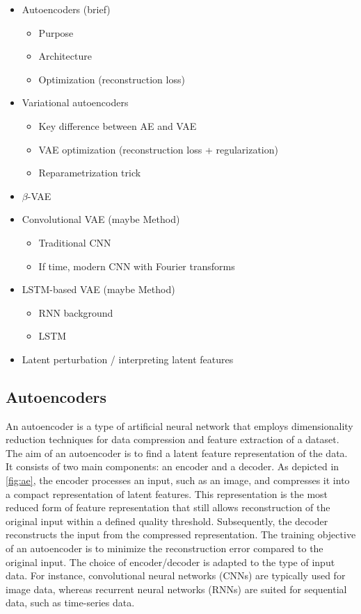 \begin{itemize}
    \item Autoencoders (brief)
    \begin{itemize}
        \item Purpose
        \item Architecture
        \item Optimization (reconstruction loss)
    \end{itemize}
    \item Variational autoencoders
    \begin{itemize}
        \item Key difference between AE and VAE
        \item VAE optimization (reconstruction loss + regularization)
        \item Reparametrization trick
    \end{itemize}
    \item $\beta$-VAE
    \item Convolutional VAE (maybe Method)
    \begin{itemize}
        \item Traditional CNN
        \item If time, modern CNN with Fourier transforms
    \end{itemize}
    \item LSTM-based VAE (maybe Method)
    \begin{itemize}
        \item RNN background
        \item LSTM
    \end{itemize}
    \item Latent perturbation / interpreting latent features 
\end{itemize}

\subsection{Autoencoders}

An autoencoder is a type of artificial neural network that employs dimensionality reduction techniques for data compression and feature extraction of a dataset. The aim of an autoencoder is to find a latent feature representation of the data. It consists of two main components: an encoder and a decoder. As depicted in \autoref{fig:ae}, the encoder processes an input, such as an image, and compresses it into a compact representation of latent features. This representation is the most reduced form of feature representation that still allows reconstruction of the original input within a defined quality threshold. Subsequently, the decoder reconstructs the input from the compressed representation. The training objective of an autoencoder is to minimize the reconstruction error compared to the original input. The choice of encoder/decoder is adapted to the type of input data. For instance, convolutional neural networks (CNNs) are typically used for image data, whereas recurrent neural networks (RNNs) are suited for sequential data, such as time-series data. 

